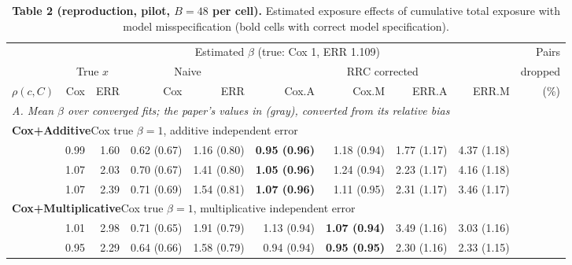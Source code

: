 \documentclass[10pt]{article}
\begin{document}
\begin{table}[ht]\centering\footnotesize
\begin{threeparttable}
\caption*{\textbf{Table 2 (reproduction, pilot, $B = 48$ per cell).} Estimated exposure effects of cumulative total exposure with model misspecification (bold cells with correct model specification).}
\begin{tabular}{l rrrrrrrr r}
\toprule
 & \multicolumn{8}{c}{Estimated $\beta$ (true: Cox     1, ERR 1.109)} & Pairs \\
\cmidrule(lr){2-9}
 & \multicolumn{2}{c}{True $x$} & \multicolumn{2}{c}{Naive} & \multicolumn{4}{c}{RRC corrected} & dropped \\
\cmidrule(lr){2-3}\cmidrule(lr){4-5}\cmidrule(lr){6-9}
$\rho(c, C)$ & Cox & ERR & Cox & ERR & Cox.A & Cox.M & ERR.A & ERR.M & (\%) \\
\midrule
\multicolumn{10}{l}{\textit{A. Mean $\hat\beta$ over converged fits; the paper's values in {\color{gray}(gray)}, converted from its relative bias}} \\[2pt]
\multicolumn{10}{l}{\textbf{Cox+Additive}\quad Cox true $\beta =     1$, additive independent error} \\
\quad 0.3 & 0.99 & 1.60 & 0.62 {\color{gray}(0.67)} & 1.16 {\color{gray}(0.80)} & \boldmath\textbf{0.95 {\color{gray}(0.96)}} & 1.18 {\color{gray}(0.94)} & 1.77 {\color{gray}(1.17)} & 4.37 {\color{gray}(1.18)} &  \\
\quad 0.6 & 1.07 & 2.03 & 0.70 {\color{gray}(0.67)} & 1.41 {\color{gray}(0.80)} & \boldmath\textbf{1.05 {\color{gray}(0.96)}} & 1.24 {\color{gray}(0.94)} & 2.23 {\color{gray}(1.17)} & 4.16 {\color{gray}(1.18)} &  \\
\quad 0.9 & 1.07 & 2.39 & 0.71 {\color{gray}(0.69)} & 1.54 {\color{gray}(0.81)} & \boldmath\textbf{1.07 {\color{gray}(0.96)}} & 1.11 {\color{gray}(0.95)} & 2.31 {\color{gray}(1.17)} & 3.46 {\color{gray}(1.17)} &  \\
\midrule
\multicolumn{10}{l}{\textbf{Cox+Multiplicative}\quad Cox true $\beta =     1$, multiplicative independent error} \\
\quad 0.3 & 1.01 & 2.98 & 0.71 {\color{gray}(0.65)} & 1.91 {\color{gray}(0.79)} & 1.13 {\color{gray}(0.94)} & \boldmath\textbf{1.07 {\color{gray}(0.94)}} & 3.49 {\color{gray}(1.16)} & 3.03 {\color{gray}(1.16)} &  \\
\quad 0.6 & 0.95 & 2.29 & 0.64 {\color{gray}(0.66)} & 1.58 {\color{gray}(0.79)} & 0.94 {\color{gray}(0.94)} & \boldmath\textbf{0.95 {\color{gray}(0.95)}} & 2.30 {\color{gray}(1.16)} & 2.33 {\color{gray}(1.15)} &  \\

\end{tabular}
\end{threeparttable}
\end{table}
\end{document}
